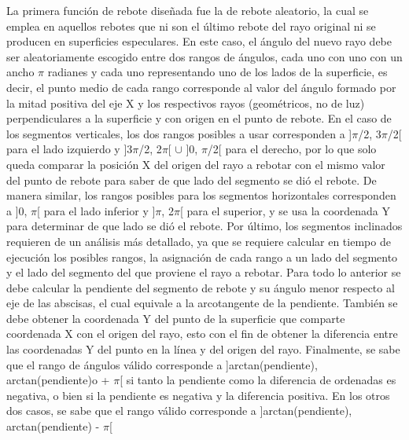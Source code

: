 \documentclass[conference]{IEEEtran}
\begin{document}
La primera función de rebote diseñada fue la de rebote aleatorio, la cual se emplea en aquellos rebotes que ni son el último rebote del rayo original ni se producen en superficies especulares. En este caso, el ángulo del nuevo rayo debe ser aleatoriamente escogido entre dos rangos de ángulos, cada uno con uno con un ancho $\pi$ radianes y cada uno representando uno de los lados de la superficie, es decir, el punto medio de cada rango corresponde al valor del ángulo formado por la mitad positiva del eje X y los respectivos rayos (geométricos, no de luz) perpendiculares a la superficie y con origen en el punto de rebote. En el caso de los segmentos verticales, los dos rangos posibles a usar corresponden a ]$\pi$/2, 3$\pi$/2[ para el lado izquierdo y ]3$\pi$/2, 2$\pi$[ $\cup$ ]0,  $\pi$/2[ para el derecho, por lo que solo queda comparar la posición X del origen del rayo a rebotar con el mismo valor del punto de rebote para saber de que lado del segmento se dió el rebote. De manera similar, los rangos posibles para los segmentos horizontales corresponden a ]0, $\pi$[ para el lado inferior y ]$\pi$,  2$\pi$[ para el superior, y se usa la coordenada Y para determinar de que lado se dió el rebote. Por último, los segmentos inclinados requieren de un análisis más detallado, ya que se requiere calcular en tiempo de ejecución los posibles rangos, la asignación de cada rango a un lado del segmento y el lado del segmento del que proviene el rayo a rebotar. Para todo lo anterior se debe calcular la pendiente del segmento de rebote y su ángulo menor respecto al eje de las abscisas, el cual equivale a la arcotangente de la pendiente. También se debe obtener la coordenada Y del punto de la superficie que comparte coordenada X con el origen del rayo, esto con el fin de obtener la diferencia entre las coordenadas Y del punto en la línea y del origen del rayo. Finalmente, se sabe que el rango de ángulos válido corresponde a ]arctan(pendiente), arctan(pendiente)o + $\pi$[ si tanto la pendiente como la diferencia de ordenadas es negativa, o bien si la pendiente es negativa y la diferencia positiva. En los otros dos casos, se sabe que el rango válido corresponde a ]arctan(pendiente), arctan(pendiente) - $\pi$[
\end{document}
